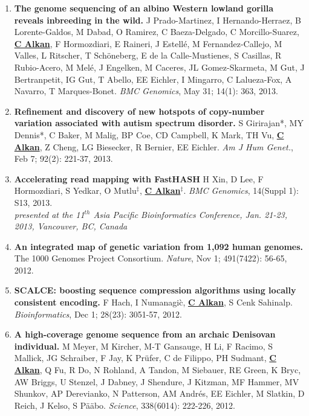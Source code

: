 \begin{enumerate}
        

\item
        {\bf The genome sequencing of an albino Western lowland gorilla reveals inbreeding in the wild.}
        J Prado-Martinez, I Hernando-Herraez, B Lorente-Galdos, M Dabad, O Ramirez, C Baeza-Delgado, C Morcillo-Suarez, 
        {\bf {\underline {C Alkan}}}, F Hormozdiari, E Raineri, J Estellé, M Fernandez-Callejo, M Valles, L Ritscher, T Schöneberg, E de la Calle-Mustienes, 
        S Casillas, R Rubio-Acero, M Melé, J Engelken, M Caceres, JL Gomez-Skarmeta, M Gut, J Bertranpetit, IG Gut, T Abello, 
        EE Eichler, I Mingarro, C Lalueza-Fox, A Navarro, T Marques-Bonet.
        {\em BMC Genomics}, May 31;  14(1): 363, 2013.

        
 \item
        {\bf Refinement and discovery of new hotspots of copy-number variation associated with autism spectrum disorder.}
        S Girirajan*, MY Dennis*, C Baker, M Malig, BP Coe, CD Campbell, K Mark, TH Vu,
        {\bf {\underline {C Alkan}}}, Z Cheng, LG Biesecker, R Bernier, EE Eichler.
        {\em Am J Hum Genet.}, Feb 7;  92(2): 221-37, 2013.

 \item
        {\bf Accelerating read mapping with FastHASH}
        H Xin, D Lee, F Hormozdiari, S Yedkar, O Mutlu$^\ddag$, {\bf {\underline {C Alkan}}}$^\ddag$.
        {\em BMC Genomics}, 14(Suppl 1): S13, 2013.\\
        \hspace*{1cm} {\footnotesize {\em presented at the  11$^{th}$  Asia Pacific Bioinformatics Conference,
            Jan. 21-23, 2013, Vancouver, BC, Canada}}
       
       \clearpage 
 \item
        {\bf An integrated map of genetic variation from 1,092 human genomes.}
        The 1000 Genomes Project Consortium. 
        {\em Nature}, Nov 1;  491(7422): 56-65, 2012.
        
 \item
        {\bf SCALCE: boosting sequence compression algorithms using locally consistent encoding.}
        F Hach, I Numanagi\`{c}, {\bf {\underline {C Alkan}}}, S Cenk Sahinalp.  
        {\em Bioinformatics}, Dec 1;  28(23): 3051-57, 2012.

 \item
        {\bf A high-coverage genome sequence from an archaic Denisovan individual.}
        M Meyer, M Kircher, M-T Gansauge, H Li, F Racimo, S Mallick, JG Schraiber, F Jay, K Pr\"{u}fer, C de Filippo, PH Sudmant, 
        {\bf {\underline {C Alkan}}}, Q Fu, R Do, N Rohland, A Tandon, M Siebauer, RE Green, 
        K Bryc, AW Briggs, U Stenzel, J Dabney, J Shendure, J Kitzman, MF Hammer, MV Shunkov, 
        AP Derevianko, N Patterson, AM Andr\'{e}s, EE Eichler, M Slatkin, D Reich, J Kelso, S P\"{a}\"{a}bo. 
        {\em Science}, 338(6014): 222-226, 2012.


\end{enumerate}
